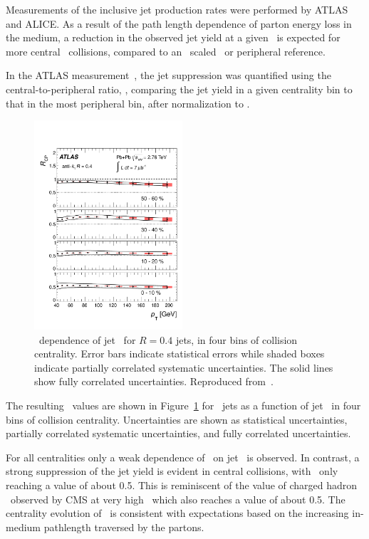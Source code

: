 Measurements of the inclusive jet production rates were performed by ATLAS~\cite{Aad:2012is} and ALICE.
As a result of the path length dependence of parton energy loss in the medium, 
a reduction in the observed jet yield at a given \pT\ is expected for more 
central \PbPb\ collisions, compared to an \Ncoll\ scaled \pp\ or peripheral reference.

In the ATLAS measurement~\cite{Aad:2012is}, the jet suppression was quantified using the central-to-peripheral ratio, 
\Rcp, comparing the jet yield in a given centrality bin to that in the most peripheral bin, after 
normalization to \Ncoll.

\begin{figure}[!h]
\begin{center}
\includegraphics[width=0.49\textwidth]{jetfigures/ATLAS_jetRCP_04.pdf}
\caption{
\pT\ dependence of jet \Rcp\ for  $R=0.4$ jets,
in four bins of collision centrality. Error bars indicate
statistical errors while shaded boxes indicate
partially correlated systematic uncertainties. 
The solid lines show fully correlated uncertainties. Reproduced from~\cite{Aad:2012is}.}
\label{fig:GR:rcprfour}
\end{center}
\end{figure}
The resulting \Rcp\ values are shown in Figure~\ref{fig:GR:rcprfour} 
for  \RFour\ jets as a function of jet \pT\ in four bins
of collision centrality.
Uncertainties are shown as statistical uncertainties, partially correlated systematic
uncertainties, and fully correlated uncertainties.

For all centralities only a weak dependence of \Rcp\ on jet \pT\ is observed. 
In contrast, a strong suppression of the jet yield is evident in
central collisions, with \Rcp\ only reaching a value of about 0.5. 
This is reminiscent of the value of charged hadron \Raa\ observed 
by CMS at very high \pT\, which also reaches a value of about 0.5.
The centrality evolution of \Rcp\ is consistent with expectations
based on the increasing in-medium pathlength traversed by the partons.

